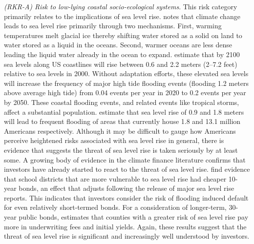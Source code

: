 \textit{(RKR-A) Risk to low-lying coastal socio-ecological systems}. This risk category primarily relates to the implications of sea level rise. \cite{lindsey2022climate} notes that climate change leads to sea level rise primarily through two mechanisms. First, warming temperatures melt glacial ice thereby shifting water stored as a solid on land to water stored as a liquid in the oceans. Second, warmer oceans are less dense leading the liquid water already in the ocean to expand. \cite{sweet2022global} estimate that by 2100 sea levels along US coastlines will rise between 0.6 and 2.2 meters (2--7.2 feet) relative to sea levels in 2000. Without adaptation efforts, these elevated sea levels will increase the frequency of major high tide flooding events (flooding 1.2 meters above average high tide) from 0.04 events per year in 2020 to 0.2 events per year by 2050. These coastal flooding events, and related events like tropical storms, affect a substantial population. \cite{hauer2016millions} estimate that sea level rise of 0.9 and 1.8 meters will lead to frequent flooding of areas that currently house 1.8 and 13.1 million Americans respectively. Although it may be difficult to gauge how Americans perceive heightened risks associated with sea level rise in general, there is evidence that suggests the threat of sea level rise is taken seriously by at least some. A growing body of evidence in the climate finance literature confirms that investors have already started to react to the threat of sea level rise. \cite{goldsmith2019sea} find evidence that school districts that are more vulnerable to sea level rise had cheaper 10-year bonds, an effect that adjusts following the release of major sea level rise reports. This indicates that investors consider the risk of flooding induced default for even relatively short-termed bonds. For a consideration of longer-term, 30-year public bonds, \cite{painter2020inconvenient} estimates that counties with a greater risk of sea level rise pay more in underwriting fees and initial yields. Again, these results suggest that the threat of sea level rise is significant and increasingly well understood by investors. 

